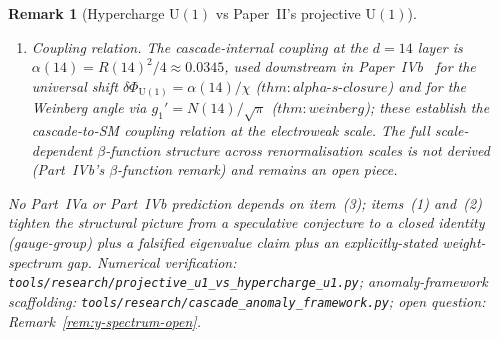 \documentclass[12pt,a4paper]{article}
\newtheorem{remark}[theorem]{Remark}
\begin{document}
\begin{remark}[Hypercharge $\mathrm{U}(1)$ vs Paper~II's projective $\mathrm{U}(1)$]
\begin{enumerate}
as an explicit open question in
Remark~\ref{rem:y-spectrum-open} below.
\item \emph{Coupling relation.} The cascade-internal coupling
at the $d=14$ layer is $\alpha(14)=R(14)^2/4\approx 0.0345$, used
downstream in Paper~IVb~\cite{part4b} for the universal shift
$\delta\Phi_{\mathrm{U}(1)}=\alpha(14)/\chi$
($\mathit{thm{:}alpha\text{-}s\text{-}closure}$) and for the
Weinberg angle via $g_1' = N(14)/\sqrt{\pi}$
($\mathit{thm{:}weinberg}$); these establish the cascade-to-SM
coupling relation at the electroweak scale. The full
scale-dependent $\beta$-function structure across renormalisation
scales is not derived (Part~IVb's $\beta$-function remark) and
remains an open piece.
\end{enumerate}
No Part~IVa or Part~IVb prediction depends on item~(3); items~(1)
and~(2) tighten the structural picture from a speculative conjecture
to a closed identity (gauge-group) plus a falsified eigenvalue claim
plus an explicitly-stated weight-spectrum gap. Numerical
verification: \texttt{tools/research/projective\_u1\_vs\_hypercharge\_u1.py};
anomaly-framework scaffolding:
\texttt{tools/research/cascade\_anomaly\_framework.py};
open question: Remark~\ref{rem:y-spectrum-open}.
\end{remark}
\end{document}
